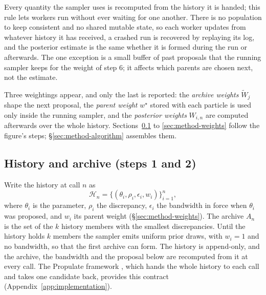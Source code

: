 \documentclass[10pt]{article}
\theoremstyle{plain}
\theoremstyle{definition}
\begin{document}
Every quantity the sampler uses is recomputed from the history it is handed; this rule lets workers run without ever waiting for one another. There is no population to keep consistent and no shared mutable state, so each worker updates from whatever history it has received, a crashed run is recovered by replaying its log, and the posterior estimate is the same whether it is formed during the run or afterwards. The one exception is a small buffer of past proposals that the running sampler keeps for the weight of step 6; it affects which parents are chosen next, not the estimate.

Three weightings appear, and only the last is reported: the \emph{archive weights} $\tilde W_j$ shape the next proposal, the \emph{parent weight} $w^\star$ stored with each particle is used only inside the running sampler, and the \emph{posterior weights} $W_{i,n}$ are computed afterwards over the whole history. Sections~\ref{sec:method-history} to \ref{sec:method-weights} follow the figure's steps; \S\ref{sec:method-algorithm} assembles them.

\subsection{History and archive (steps 1 and 2)}\label{sec:method-history}
Write the history at call $n$ as
\begin{equation}
\mathcal{H}_n = \bigl\{(\theta_i,\rho_i,\epsilon_i,w_i)\bigr\}_{i=1}^{n},
\label{eq:history}
\end{equation}
where $\theta_i$ is the parameter, $\rho_i$ the discrepancy, $\epsilon_i$ the bandwidth in force when $\theta_i$ was proposed, and $w_i$ its parent weight (\S\ref{sec:method-weights}). The archive $A_n$ is the set of the $k$ history members with the smallest discrepancies. Until the history holds $k$ members the sampler emits uniform prior draws, with $w_i=1$ and no bandwidth, so that the first archive can form. The history is append-only, and the archive, the bandwidth and the proposal below are recomputed from it at every call. The Propulate framework \citep{taubert2023propulate}, which hands the whole history to each call and takes one candidate back, provides this contract (Appendix~\ref{app:implementation}).
\end{document}
